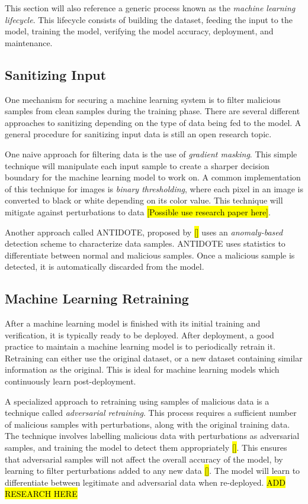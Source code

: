 \documentclass[11pt,conference]{IEEEtran}
\begin{document}
This section will also reference a generic process known as the \emph{machine
learning lifecycle}. This lifecycle consists of building the dataset, feeding
the input to the model, training the model, verifying the model accuracy,
deployment, and maintenance.

\subsection{Sanitizing Input}
One mechanism for securing a machine learning system is to 
filter malicious samples from clean samples during the training phase. There
are several different approaches to sanitizing depending on the type of data
being fed to the model. A general procedure for sanitizing input data is still
an open research topic.

One naive approach for filtering data is the use of \emph{gradient masking}.
This simple technique will manipulate each input sample to create a sharper
decision boundary for the machine learning model to work on. A common
implementation of this technique for images is \emph{binary thresholding},
where each pixel in an image is converted to black or white depending on its
color value. This technique will mitigate against perturbations to data
\hl{[Possible use research paper here]}.

Another approach called ANTIDOTE, proposed by \hl{[]} uses an \emph{anomaly-based}
detection scheme to characterize data samples. ANTIDOTE uses statistics to
differentiate between normal and malicious samples. Once a malicious sample is
detected, it is automatically discarded from the model.

\subsection{Machine Learning Retraining}
After a machine learning model is finished with its initial training and
verification, it is typically ready to be deployed. After deployment, a good
practice to maintain a machine learning model is to periodically retrain it.
Retraining can either use the original dataset, or a new dataset containing
similar information as the original. This is ideal for machine learning models
which continuously learn post-deployment.

A specialized approach to retraining using samples of malicious data is a technique called
\emph{adversarial retraining}. This process requires  
a sufficient number of malicious samples with perturbations, along with the
original training data. The technique
involves labelling malicious data with perturbations as adversarial samples, and training
the model to detect them appropriately \hl{[]}. This ensures that adversarial samples will not affect
the overall accuracy of the model, by learning to filter perturbations added to
any new data \hl{[]}. The model will learn to differentiate between legitimate and
adversarial data when re-deployed.
\hl{ADD RESEARCH HERE}
\end{document}
